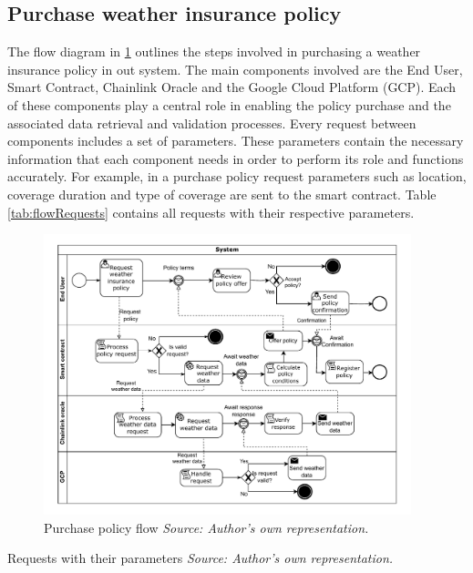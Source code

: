 \subsection{Purchase weather insurance policy}

The flow diagram in \cref{fig:purchasePolicyFlow} outlines the steps involved in purchasing a weather insurance policy in out system. The main components involved are the End User, Smart Contract, Chainlink Oracle and the Google Cloud Platform (GCP). Each of these components play a central role in enabling the policy purchase and the associated data retrieval and validation processes. Every request between components includes a set of parameters. These parameters contain the necessary information that each component needs in order to perform its role and functions accurately. For example, in a purchase policy request parameters such as location, coverage duration and type of coverage are sent to the smart contract. Table \cref{tab:flowRequests} contains all requests with their respective parameters.

\begin{figure}[h]
    \centering
    \includegraphics[width=0.95\textwidth]{figures/flow-purchase-policy.drawio.pdf}
    \caption{Purchase policy flow \textit{Source: Author's own representation.}}
    \label{fig:purchasePolicyFlow}
\end{figure}

\begin{table}[h]
    \centering
    
    \caption{Requests with their parameters \textit{Source: Author's own representation.}}
    \label{tab:flowRequests}
\end{table}


